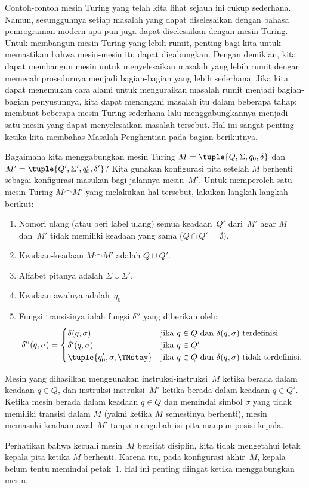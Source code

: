 \documentclass[../../../include/open-logic-section]{subfiles}
\begin{document}

\begin{explain}
Contoh-contoh mesin Turing yang telah kita lihat sejauh ini cukup sederhana.
Namun, sesungguhnya setiap masalah yang dapat diselesaikan dengan bahasa
pemrograman modern apa pun juga dapat diselesaikan dengan mesin Turing. Untuk
membangun mesin Turing yang lebih rumit, penting bagi kita untuk memastikan
bahwa mesin-mesin itu dapat digabungkan. Dengan demikian, kita dapat membangun
mesin untuk menyelesaikan masalah yang lebih rumit dengan memecah prosedurnya
menjadi bagian-bagian yang lebih sederhana. Jika kita dapat menemukan cara
alami untuk menguraikan masalah rumit menjadi bagian-bagian penyusunnya, kita
dapat menangani masalah itu dalam beberapa tahap: membuat beberapa mesin
Turing sederhana lalu menggabungkannya menjadi satu mesin yang dapat
menyelesaikan masalah tersebut. Hal ini sangat penting ketika kita membahas
Masalah Penghentian pada bagian berikutnya.

Bagaimana kita menggabungkan mesin Turing $M = \tuple{Q, \Sigma, q_0, \delta}$
dan~$M' = \tuple{Q', \Sigma', q_0', \delta'}$? Kita gunakan konfigurasi pita
setelah $M$ berhenti sebagai konfigurasi masukan bagi jalannya mesin~$M'$.
Untuk memperoleh satu mesin Turing $M \frown M'$ yang melakukan hal tersebut,
lakukan langkah-langkah berikut:
\begin{enumerate}
    \item Nomori ulang (atau beri label ulang) semua keadaan~$Q'$ dari~$M'$
    agar $M$ dan~$M'$ tidak memiliki keadaan yang sama
    ($Q \cap Q' = \emptyset$).
    \item Keadaan-keadaan $M \frown M'$ adalah $Q \cup Q'$.
    \item Alfabet pitanya adalah $\Sigma \cup \Sigma'$.
    \item Keadaan awalnya adalah~$q_0$.
    \item Fungsi transisinya ialah fungsi $\delta''$ yang diberikan oleh:
    \[\delta''(q,\sigma) =
    \begin{cases}
      \delta(q,\sigma) & \text{jika $q \in Q$ dan $\delta(q,\sigma)$ terdefinisi}\\
      \delta'(q,\sigma) & \text{jika $q \in Q'$}\\
      \tuple{q_0', \sigma, \TMstay} & \text{jika $q \in Q$ dan
      $\delta(q,\sigma)$ tidak terdefinisi.}
    \end{cases}\]
\end{enumerate}
Mesin yang dihasilkan menggunakan instruksi-instruksi~$M$ ketika berada dalam
keadaan $q \in Q$, dan instruksi-instruksi~$M'$ ketika berada dalam keadaan
$q \in Q'$. Ketika mesin berada dalam keadaan $q \in Q$ dan memindai simbol
$\sigma$ yang tidak memiliki transisi dalam $M$ (yakni ketika $M$ semestinya
berhenti), mesin memasuki keadaan awal~$M'$ tanpa mengubah isi pita maupun
posisi kepala.

Perhatikan bahwa kecuali mesin~$M$ bersifat disiplin, kita tidak mengetahui
letak kepala pita ketika $M$ berhenti. Karena itu, pada konfigurasi akhir~$M$,
kepala belum tentu memindai petak~$1$. Hal ini penting diingat ketika
menggabungkan mesin.
\end{explain}
\end{document}
